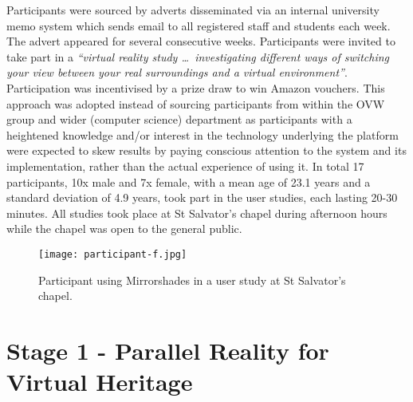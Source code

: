 Participants were sourced by adverts disseminated via an internal university memo system which sends email to all registered staff and students each week. The advert appeared for several consecutive weeks. Participants were invited to take part in a \textit{``virtual reality study \ldots\ investigating different ways of switching your view between your real surroundings and a virtual environment''}. Participation was incentivised by a prize draw to win Amazon vouchers. This approach was adopted instead of sourcing participants from within the OVW group and wider (computer science) department as participants with a heightened knowledge and/or interest in the technology underlying the platform were expected to skew results by paying conscious attention to the system and its implementation, rather than the actual experience of using it. In total 17 participants, 10x male and 7x female, with a mean age of 23.1 years and a standard deviation of 4.9 years, took part in the user studies, each lasting 20-30 minutes. All studies took place at St Salvator's chapel during afternoon hours while the chapel was open to the general public.

\begin{figure}
	\begin{center}
		\texttt{[image: participant-f.jpg]}
		\caption{Participant using Mirrorshades in a user study at St Salvator's chapel.}
		\label{participant-f.jpg}
	\end{center}
\end{figure}


\section{Stage 1 - Parallel Reality for Virtual Heritage}

